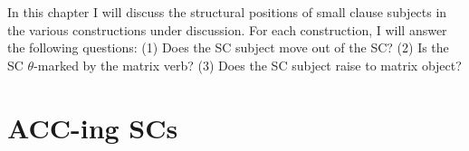 \documentclass[letterpaper]{article}
\begin{document}
In this chapter I will discuss the structural positions of small clause subjects in the various constructions under discussion.
For each construction, I will answer the following questions:
(1) Does the SC subject move out of the SC?
(2) Is the SC $\theta$-marked by the matrix verb?
(3) Does the SC subject raise to matrix object?

\section{ACC-ing SCs}
\end{document}
